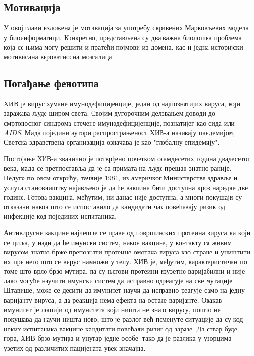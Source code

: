 \documentclass[12pt,oneside]{memoir}
\begin{document}
\begin{CJK}{UTF8}{ipxm}
\chapter{Мотивација}
У овој глави изложена је мотивација за употребу скривених Марковљевих модела у биоинформатици. Конкретно, представљена су два важна биолошка проблема која се њима могу решити и пратећи појмови из домена, као и једна историјски мотивисана вероватносна мозгалица.

\section{Погађање фенотипа}
ХИВ је вирус хумане имунодефицијенције, један од најпознатијих вируса, који заражава људе широм света. Својим дугорочним деловањем доводи до смртоносног синдрома стечене имунодефицијенције, познатијег као сида или \textit{AIDS}. Мада поједини аутори распрострањеност ХИВ-а називају пандемијом, Светска здравствена организација означава је као "глобалну епидемију"\cite{who}.

Постојање ХИВ-а званично је потврђено почетком осамдесетих година двадесетог века, мада се претпоставља да је са примата на људе прешао знатно раније. Недуго по овом открићу, тачније 1984, из америчког Министарства здравља и услуга становништву најављено је да ће вакцина бити доступна кроз наредне две године. Готова вакцина, међутим, ни данас није доступна, а многи покушаји су отказани након што се испоставило да кандидати чак повећавају ризик од инфекције код појединих испитаника.

Антивирусне вакцине најчешће се праве од површинских протеина вируса на који се циља, у нади да ће имунски систем, након вакцине, у контакту са живим вирусом знатно брже препознати протеине омотача вируса као стране и уништити их пре него што се вирус намножи у телу. ХИВ је, међутим, карактеристичан по томе што врло брзо мутира, па су његови протеини изузетно варијабилни и није лако могуће научити имунски систем да исправно одреагује на све мутације. Штавише, може се десити да имунитет научи да исправно реагује само на једну варијанту вируса, а да реакција нема ефекта на остале варијанте. Овакав имунитет је лошији од имунитета који ништа не зна о вирусу, пошто не покушава да научи ништа ново, што је разлог већ поменуте ситуације да су код неких испитаника вакцине кандитати повећали ризик од заразе. Да ствар буде гора, ХИВ брзо мутира и унутар једне особе, тако да је разлика у узорцима узетих од различитих пацијената увек значајна.


\end{CJK}
\end{document}
